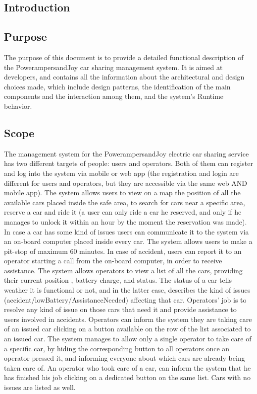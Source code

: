 \documentclass{article}
\begin{document}
\newpage   			%
\begin{flushleft}  

  \section{Introduction}


\subsection{Purpose}%

The purpose of this document is to provide a detailed functional description of the Power{ampersand}Joy car sharing management system. It is aimed at developers, and contains all the information about the architectural and design choices made, which include design patterns, the identification of the main components and the interaction among them, and the system's Runtime behavior.   
  
\subsection{Scope} %
The management system for the  Power{ampersand}Joy electric car sharing service has two different targets of people: users and operators. 
Both of them can register and log into the system via mobile or web app (the registration and login are different for users and operators, but they are accessible via the same web AND mobile app). 
The system allows users to view on a map the position of all the available cars placed inside the safe area, to search for cars  near a specific area, reserve a car and ride it (a user can only ride a car he reserved, and only if he manages to unlock it within an hour by the moment the reservation was made). In case a car has some kind of issues users can communicate it to the system via an on-board computer placed inside every car. The system allows users to make a pit-stop of maximum 60 minutes. In case of accident, users can report it to an operator starting a call from the on-board computer, in order to receive assistance.
The system allows operators to view a list of all the cars, providing their current position , battery charge, and status. The status of a car tells weather it is functional or not, and in the latter case, describes the kind of issues (accident/lowBattery/AssistanceNeeded) affecting that car. Operators' job is to resolve any kind of issue on those cars that need it and provide assistance to users involved in accidents. Operators can inform the system they are taking care of an issued car clicking on a button available on the row of the list associated to an issued car. The system manages to allow only a single operator to take care of a specific car, by hiding the corresponding button to all operators once an operator pressed it, and informing everyone about which cars are already being taken care of. An operator who took care of a car, can inform the system that he has finished his job clicking on a dedicated button on the same list. Cars with no issues are listed as well.


\end{flushleft}
\end{document}
